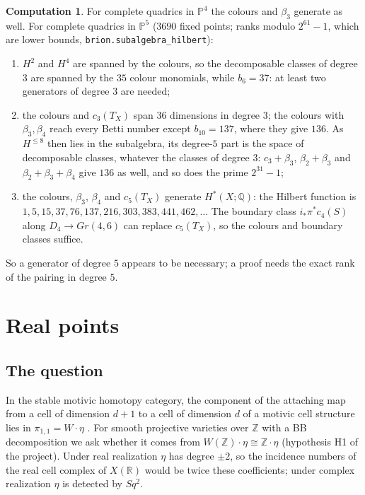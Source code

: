 \documentclass[11pt]{amsart}
\theoremstyle{definition}
\newtheorem{computation}[theorem]{Computation}
\theoremstyle{remark}
\newcommand{\code}[1]{\texttt{#1}}
\newcommand{\PP}{\mathbb{P}}
\newcommand{\QQ}{\mathbb{Q}}
\newcommand{\ZZ}{\mathbb{Z}}
\newcommand{\RR}{\mathbb{R}}
\begin{document}
\begin{computation}\label{comp:generatorsP5}
For complete quadrics in $\PP^4$ the colours and $\beta_3$ generate as well.
For complete quadrics in $\PP^5$ ($3690$ fixed points; ranks modulo
$2^{61}-1$, which are lower bounds, \code{brion.subalgebra\_hilbert}):
\begin{enumerate}
\item $H^2$ and $H^4$ are spanned by the colours, so the decomposable classes
of degree $3$ are spanned by the $35$ colour monomials, while $b_6=37$: at
least two generators of degree $3$ are needed;
\item the colours and $c_3(T_X)$ span $36$ dimensions in degree $3$; the colours
with $\beta_3,\beta_4$ reach every Betti number except $b_{10}=137$, where they
give $136$. As $H^{\le8}$ then lies in the subalgebra, its degree-$5$ part is
the space of decomposable classes, whatever the classes of degree $3$:
$c_3+\beta_3$, $\beta_2+\beta_3$ and $\beta_2+\beta_3+\beta_4$ give $136$ as well, and so
does the prime $2^{31}-1$;
\item the colours, $\beta_3$, $\beta_4$ and $c_5(T_X)$ generate $H^*(X;\QQ)$: the
Hilbert function is $1,5,15,37,76,137,216,303,383,441,462,\dots$ The boundary
class $i_*\pi^*c_4(S)$ along $D_4\to Gr(4,6)$ can replace $c_5(T_X)$, so the
colours and boundary classes suffice.
\end{enumerate}
So a generator of degree $5$ appears to be necessary; a proof needs the
exact rank of the pairing in degree $5$.
\end{computation}

\section{Real points}\label{sec:real}

\subsection{The question}
In the stable motivic homotopy category, the component of the attaching map
from a cell of dimension $d+1$ to a cell of dimension $d$ of a motivic cell
structure lies in $\pi_{1,1}=W\cdot\eta$ \cite{MorelVoevodsky,DuggerIsaksen}.
For smooth projective varieties over $\ZZ$ with a BB decomposition we ask
whether it comes from $W(\ZZ)\cdot\eta\cong\ZZ\cdot\eta$ (hypothesis H1 of the
project). Under real realization $\eta$ has degree $\pm2$, so the incidence
numbers of the real cell complex of $X(\RR)$ would be twice these
coefficients; under complex realization $\eta$ is detected by $Sq^2$.
\end{document}
